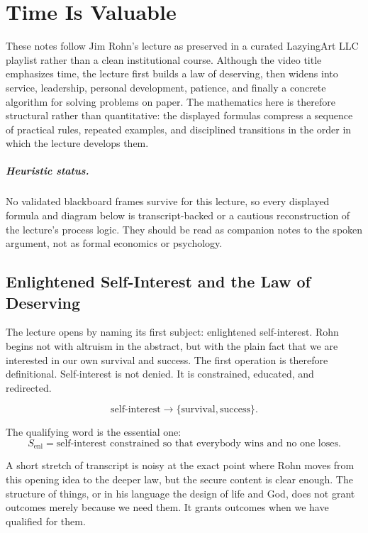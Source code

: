 \chapter{Time Is Valuable}

These notes follow Jim Rohn's lecture as preserved in a curated LazyingArt LLC playlist rather than a clean institutional course. Although the video title emphasizes time, the lecture first builds a law of deserving, then widens into service, leadership, personal development, patience, and finally a concrete algorithm for solving problems on paper. The mathematics here is therefore structural rather than quantitative: the displayed formulas compress a sequence of practical rules, repeated examples, and disciplined transitions in the order in which the lecture develops them.

\paragraph{Heuristic status.}
No validated blackboard frames survive for this lecture, so every displayed formula and diagram below is transcript-backed or a cautious reconstruction of the lecture's process logic. They should be read as companion notes to the spoken argument, not as formal economics or psychology.

\section{Enlightened Self-Interest and the Law of Deserving}

The lecture opens by naming its first subject: enlightened self-interest. Rohn begins not with altruism in the abstract, but with the plain fact that we are interested in our own survival and success. The first operation is therefore definitional. Self-interest is not denied. It is constrained, educated, and redirected.

\begin{equation}
\text{self-interest} \rightarrow \{\text{survival},\text{success}\}.
\end{equation}

The qualifying word is the essential one:
\begin{equation}
S_{\mathrm{enl}}=\text{self-interest constrained so that everybody wins and no one loses}.
\end{equation}

A short stretch of transcript is noisy at the exact point where Rohn moves from this opening idea to the deeper law, but the secure content is clear enough. The structure of things, or in his language the design of life and God, does not grant outcomes merely because we need them. It grants outcomes when we have qualified for them.

